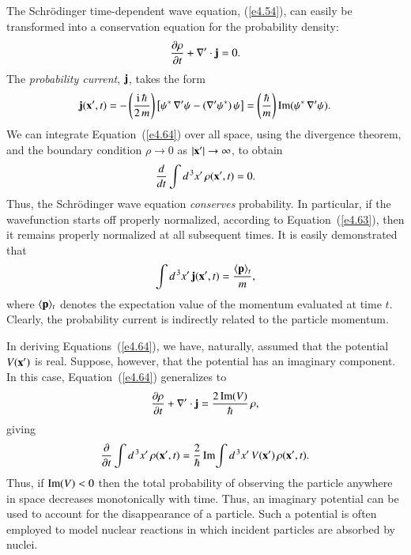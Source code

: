 The Schr\"{o}dinger  time-dependent wave equation, (\ref{e4.54}), can easily be
transformed into a conservation equation for the probability
density:
\begin{equation}\label{e4.64}
\frac{\partial \rho}{\partial t} + \nabla'\cdot {\bf j} = 0.
\end{equation}
The {\em probability
current}, ${\bf j}$, takes the form
\begin{equation}\label{e4.65}
{\bf j}({\bf x}', t) = - \left(\frac{{\rm i}\, \hbar}{2\,m}\right)
\left[ \psi^\ast\, \nabla' \psi - (\nabla' \psi^\ast)\,\psi\right]
= \left(\frac{\hbar}{m} \right){\rm Im} (\psi^\ast \,\nabla' \psi).
\end{equation}
We can integrate Equation~(\ref{e4.64}) over all space, using the divergence theorem,
and the boundary condition $\rho\rightarrow 0$ as $|{\bf x'}|\rightarrow
\infty$, to obtain 
\begin{equation}
\frac{d}{d t} \int d^{\,3} x'\,\rho({\bf x'}, t) = 0.
\end{equation}
Thus, the Schr\"{o}dinger  wave equation {\em  conserves}\/
 probability. In particular, if the
wavefunction starts off properly normalized, according to Equation~(\ref{e4.63}), then it
remains properly normalized at all subsequent times. It is easily
demonstrated that
\begin{equation}
\int d^{\,3} x'\,{\bf j}({\bf x}', t)  = \frac{\langle {\bf p }\rangle_t}{m},
\end{equation}
where $\langle {\bf p} \rangle_t$ denotes the expectation value of the momentum
evaluated at time $t$.  Clearly, the probability current is indirectly related to
the particle momentum.

In deriving Equations~(\ref{e4.64}), we have, naturally, assumed that the potential $V({\bf x}')$
is real. Suppose, however, that the potential has an imaginary component. 
In this case, Equation~(\ref{e4.64}) generalizes to
\begin{equation}
\frac{\partial \rho}{\partial t} + \nabla'\cdot {\bf j} = \frac{2\,{\rm Im}(V)}{\hbar}\,
\rho,
\end{equation}
giving
\begin{equation}
\frac{\partial}{\partial t} \int  d^{\,3} x'\,\rho({\bf x'}, t) = \frac{2}{\hbar}\,
{\rm Im}\!\int
d^{\,3} x'\,V({\bf x}') \,\rho({\bf x'}, t).
\end{equation}
Thus, if ${\rm Im}(V)<0$ then the total probability of observing the particle
anywhere in space 
decreases monotonically with time. Thus, an imaginary potential can be
used to account for the disappearance of a particle. Such a potential
is often employed to model nuclear reactions in which incident particles are 
absorbed by nuclei.
 
